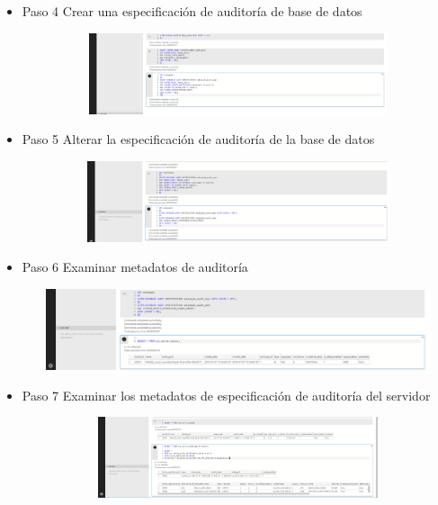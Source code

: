 \begin{itemize}
   		   \item Paso 4 Crear una especificación de auditoría de base de datos
				 
				 	
					\begin{center}
    				\includegraphics[width=16cm, height=90]{./Imagenes/Imagen_14}
   				    \end{center}
   				    
   		  \item Paso 5 Alterar la especificación de auditoría de la base de datos
				 
				 	
					\begin{center}
    				\includegraphics[width=16cm, height=90]{./Imagenes/Imagen_15}
   				    \end{center}
   				    
   	      
   	      \item Paso 6 Examinar metadatos de auditoría
				 
				 	
					\begin{center}
    				\includegraphics[width=16cm, height=90]{./Imagenes/Imagen_16}
   				    \end{center}
   				    
   	      \item Paso 7 Examinar los metadatos de especificación de auditoría del servidor
				 
				 	
					\begin{center}
    				\includegraphics[width=16cm, height=90]{./Imagenes/Imagen_17}
   				    \end{center}
   				    

\end{itemize}
